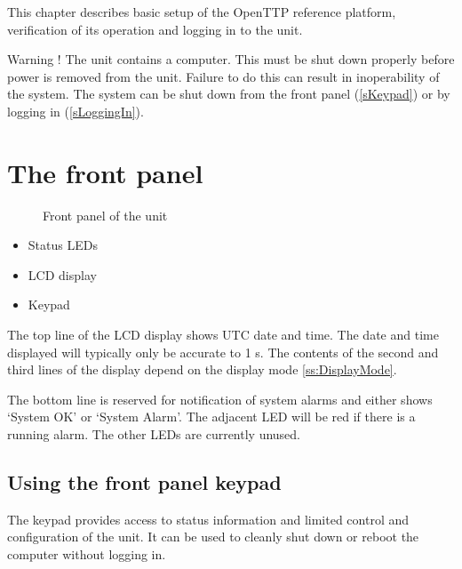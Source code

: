 
This chapter describes basic setup of the OpenTTP reference  platform, verification of its operation and logging in to the unit.

Warning !
The  unit contains a computer. This must be shut down properly
before power is removed from the unit. Failure to do this can 
result in inoperability of the system.
The system can be shut down from the front panel (\ref{sKeypad}) or by
logging in (\ref{sLoggingIn}).


\section{The front panel \label{sFrontPanel}}

\begin{figure}[h]
\caption{Front panel of the unit}
\end{figure}

\begin{itemize}
	\item[\mykey{A}] Status LEDs
	\item[\mykey{B}] LCD display
	\item[\mykey{C}] Keypad
\end{itemize}

The top line of the LCD display shows UTC date and time.
The date and time displayed will typically only be accurate to 1 s.
The contents of the second and third lines of the display depend on the display mode
\ref{ss:DisplayMode}.

The bottom line is reserved for notification of system alarms and either shows
`System OK' or `System Alarm'.
The adjacent LED will be red if there is a running alarm.
The other LEDs are currently unused.

\subsection{Using the front panel keypad \label{sKeypad} }

The keypad provides access to status information and limited control and configuration of the unit. 
It can be used to cleanly shut down or reboot the computer without logging in. 

